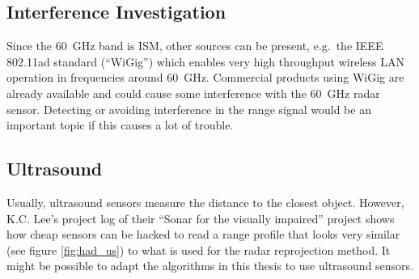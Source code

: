 \subsection{Interference Investigation}\label{interference-investigation}
Since the \SI{60}{GHz} band is ISM, other sources can be present, e.g.~the
IEEE 802.11ad standard \cite{IEEE2014} (``WiGig'') which enables very
high throughput wireless LAN operation in frequencies around \SI{60}{GHz}.
Commercial products using WiGig are already available and could cause
some interference with the \SI{60}{GHz} radar sensor. Detecting or avoiding
interference in the range signal would be an important topic if this
causes a lot of trouble.


\subsection{Ultrasound}\label{ultrasound}
Usually, ultrasound sensors measure the distance to the closest object.
However, K.C. Lee's project log of their ``Sonar for the visually
impaired'' project \cite{Lee2015} shows how cheap sensors can be hacked
to read a range profile that looks very similar (see figure \cref{fig:had_us}) to
what is used for the radar reprojection method. It might be possible to
adapt the algorithms in this thesis to use ultrasound sensors.

